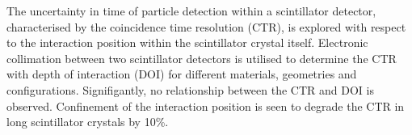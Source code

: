 The uncertainty in time of particle detection within a scintillator detector, characterised by the coincidence time resolution (CTR), is explored with respect to the interaction position within the scintillator crystal itself. Electronic collimation between two scintillator detectors is utilised to determine the CTR with depth of interaction (DOI) for different materials, geometries and configurations. Signifigantly, no relationship between the CTR and DOI is observed. Confinement of the interaction position is seen to degrade the CTR in long scintillator crystals by 10\%.